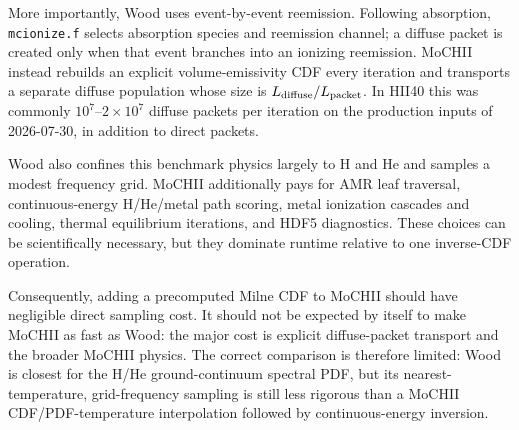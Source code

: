 \documentclass[11pt]{my_memo}
\begin{document}
More importantly, Wood uses event-by-event reemission.  Following absorption, \texttt{mcionize.f} selects absorption species and reemission channel; a diffuse packet is created only when that event branches into an ionizing reemission.  MoCHII instead rebuilds an explicit volume-emissivity CDF every iteration and transports a separate diffuse population whose size is $L_{\rm diffuse}/L_{\rm packet}$.  In HII40 this was commonly $10^7$--$2\times10^7$ diffuse packets per iteration on the production inputs of 2026-07-30, in addition to direct packets.

Wood also confines this benchmark physics largely to H and He and samples a modest frequency grid.  MoCHII additionally pays for AMR leaf traversal, continuous-energy H/He/metal path scoring, metal ionization cascades and cooling, thermal equilibrium iterations, and HDF5 diagnostics.  These choices can be scientifically necessary, but they dominate runtime relative to one inverse-CDF operation.

Consequently, adding a precomputed Milne CDF to MoCHII should have negligible direct sampling cost.  It should not be expected by itself to make MoCHII as fast as Wood: the major cost is explicit diffuse-packet transport and the broader MoCHII physics.  The correct comparison is therefore limited: Wood is closest for the H/He ground-continuum spectral PDF, but its nearest-temperature, grid-frequency sampling is still less rigorous than a MoCHII CDF/PDF-temperature interpolation followed by continuous-energy inversion.
\end{document}
